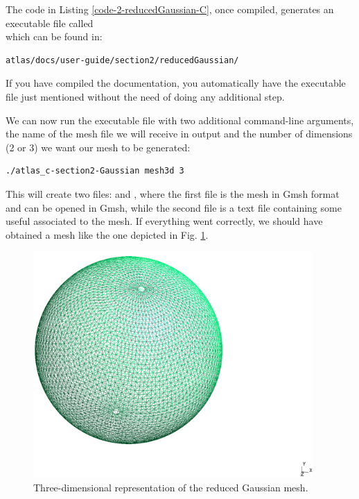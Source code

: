 The code in Listing \ref{code-2-reducedGaussian-C}, once compiled, 
generates an executable file called \\ 
 which can be found in:
%
\begin{lstlisting}[style=BashStyle]
atlas/docs/user-guide/section2/reducedGaussian/
\end{lstlisting}
% 
\begin{notebox}
If you have compiled the documentation, you automatically have 
the executable file just mentioned without the need of doing 
any additional step.
\end{notebox}
%
We can now run the executable file with two additional command-line 
arguments, the name of the mesh file we will receive in output and 
the number of dimensions (2 or 3) we want our mesh to be generated:
%
\begin{lstlisting}[style=BashStyle]
./atlas_c-section2-Gaussian mesh3d 3
\end{lstlisting}
% 
This will create two files:  and , 
where the first file is the mesh in Gmsh format and can be opened 
in Gmsh, while the second file is a text file containing some useful 
associated to the mesh.
If everything went correctly, we should have obtained a mesh like 
the one depicted in Fig. \ref{fig:section2-reducedGaussian-3d}.
%
\begin{figure}[H]
  \centering
    \includegraphics[width=0.95\textwidth]{imgs/reducedGaussian_3d}
    \caption{Three-dimensional representation of the reduced Gaussian mesh.}
    \label{fig:section2-reducedGaussian-3d}
\end{figure}
